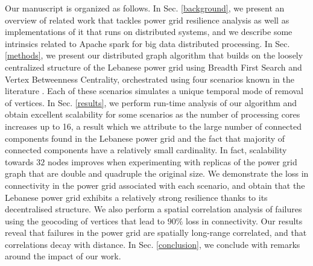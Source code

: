 Our manuscript is organized as follows. In Sec. \ref{background}, we present an overview of related work that tackles power grid resilience analysis as well as implementations of it that runs on distributed systems, and we describe some intrinsics related to Apache spark for big data distributed processing. In Sec. \ref{methods}, we present our distributed graph algorithm that builds on the loosely centralized structure of the Lebanese power grid using Breadth First Search and Vertex Betweenness Centrality, orchestrated using four scenarios known in the literature \cite{2000Natur.406..378A}. Each of these scenarios simulates a unique temporal mode of removal of vertices. 
%
%
In Sec. \ref{results}, we perform run-time analysis of our algorithm and obtain excellent scalability for some scenarios as the number of processing cores increases up to 16, a result which we attribute to the large number of connected components found in the Lebanese power grid and the fact that majority of connected components have a relatively small cardinality. In fact, scalability towards $32$ nodes improves when experimenting with replicas of the power grid graph that are double and quadruple the original size. We demonstrate the loss in connectivity in the power grid associated with each scenario, and obtain that the Lebanese power grid exhibits a relatively strong resilience thanks to its decentralised structure. We also perform a spatial correlation analysis of failures using the geocoding of vertices that lead to $90\%$ loss in connectivity. Our results reveal that failures in the power grid are spatially long-range correlated, and that correlations decay with distance. In Sec. \ref{conclusion}, we conclude with remarks around the impact of our work.%





